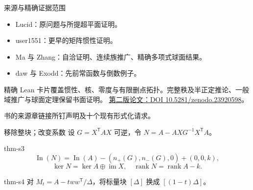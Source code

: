 \documentclass{beamer}
\begin{document}
\begin{frame}{来源与精确证据范围}
\begin{itemize}
\item Lucid：原问题与所提超平面证明。
\item user1551：更早的矩阵惯性证明。
\item Ma 与 Zhang：自洽证明、连续族推广、精确多项式球面结果。
\item daw 与 Exodd：先前常函数与倒数例子。
\end{itemize}
精确 Lean 卡片覆盖惯性、核、零度与有限删点拓扑。完整秩及半正定推论、一般域推广与球面定理保留书面证明。
\medskip
\href{https://doi.org/10.5281/zenodo.23920598}{第二版论文：DOI 10.5281/zenodo.23920598}。\par
书的来源章链接所钉声明及十个现有形式化请求。
\end{frame}
\appendix
\begin{frame}{移除整块；改变系数}
设 $G=X^{\mathsf T}AX$ 可逆，令 $N=A-AXG^{-1}X^{\mathsf T}A$。
\begin{bookresult}{thm-s3}
\[
\operatorname{In}(N)=\operatorname{In}(A)-(n_+(G),n_-(G),0)+(0,0,k),
\]
\[
\ker N=\ker A\oplus\operatorname{im}X,\quad \operatorname{rank}N=\operatorname{rank}A-k.
\]
\end{bookresult}
\begin{bookresult}{thm-s4}
对 $M_t=A-tww^{\mathsf T}/\Delta$，将标量块 $[\Delta]$ 换成 $[(1-t)\Delta]$。
\end{bookresult}
\end{frame}
\FormalVerification
\end{document}
